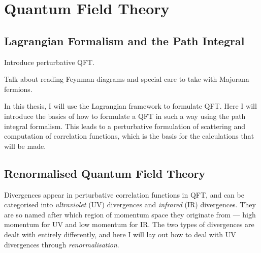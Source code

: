 \documentclass[../main.tex]{subfiles}
\begin{document}
\chapter{Quantum Field Theory}

\begin{donotread}
  \section{Lagrangian Formalism and the Path Integral}

  \begin{TODO}
    \item Introduce perturbative QFT.
    \item Talk about reading Feynman diagrams and special care to take with
    Majorana fermions.
  \end{TODO}

  In this thesis, I will use the Lagrangian framework to formulate QFT. Here I
  will introduce the basics of how to formulate a QFT in such a way using the
  path integral formalism. This leads to a perturbative formulation of scattering
  and computation of correlation functions, which is the basis for the
  calculations that will be made. \medskip

  \section{Renormalised Quantum Field Theory}


  Divergences appear in perturbative correlation functions in QFT, and can be
  categorised into \emph{ultraviolet} (UV) divergences and \emph{infrared} (IR)
  divergences. They are so named after which region of momentum space they
  originate from --- high momentum for UV and low momentum for IR. The two types
  of divergences are dealt with entirely differently, and here I will lay out how
  to deal with UV divergences through \emph{renormalisation}. \medskip


\end{donotread}
\end{document}
